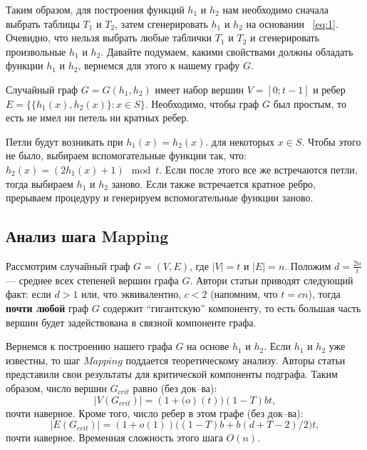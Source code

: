 \documentclass[specialist,
               substylefile = spbu.rtx,
               subf,href,colorlinks=true, 12pt]{disser}
\begin{document}
Таким образом, для построения функций $h_1$ и $h_2$ нам необходимо сначала выбрать таблицы $T_1$ и $T_2$, затем сгенерировать $h_1$ и $h_2$ на основании ~\ref{eq:1}. Очевидно, что нельзя выбрать любые таблички $T_1$ и $T_2$ и сгенерировать произвольные $h_1$ и $h_2$. Давайте подумаем, какими свойствами должны обладать функции $h_1$ и $h_2$, вернемся для этого к нашему графу $G$.

Случайный граф $G = G(h_1, h_2)$ имеет набор вершин $V = [0;t - 1]$ и ребер $E = \{\{h_1(x),h_2(x)\}: x \in S\}$. Необходимо, чтобы граф $G$ был простым, то есть не имел ни петель ни кратных ребер.

Петли будут возникать при $h_1(x) = h_2(x)$. для некоторых $x \in S$. Чтобы этого не было, выбираем вспомогательные функции так, что: $h_2(x) = (2h_1(x) + 1)\mod t$. Если после этого все же встречаются петли, тогда выбираем $h_1$ и $h_2$ заново. Если также встречается кратное ребро, прерываем процедуру и генерируем вспомогательные функции заново.

\subsection{Анализ шага Mapping} \label{sec:mapan}

Рассмотрим случайный граф $G = (V,E)$, где $|V| = t$ и $|E| = n$. Положим $d = \frac{2n}{t}$ --- среднее всех степеней вершин графа $G$. Автори статьи приводят следующий факт: если $d > 1$ или, что эквивалентно, $c < 2$ (напомним, что $t = cn$), тогда \textbf{почти любой} граф $G$ содержит ``гигантскую'' компоненту, то есть большая часть вершин будет задействована в связной компоненте графа.

Вернемся к построению нашего графа $G$ на основе $h_1$ и $h_2$. Если $h_1$ и $h_2$ уже известны, то шаг $Mapping$ поддается теоретическому анализу. Авторы статьи представили свои результаты для критической компоненты подграфа. Таким образом, число вершин $G_{crit}$ равно (без док--ва):
%
\begin{equation}\label{eq1}
|V(G_{crit})| = (1+\mathit(o)(t))(1 - T)bt,
\end{equation}
%
почти наверное. Кроме того, число ребер в этом графе (без док--ва):
%
\begin{equation}\label{eq2}
|E(G_{crit})| = (1+\mathit{o}(1))\Big((1-T)b + b(d + T - 2)/2\Big)t,
\end{equation}
%
почти наверное. 
Временная сложность этого шага $\mathit{O}(n)$.

\newpage
\end{document}
